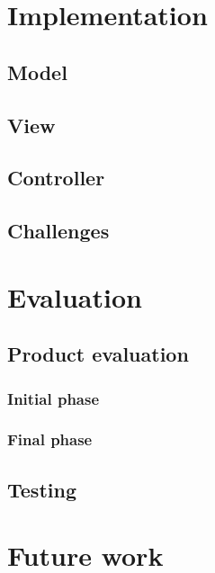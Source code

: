 \documentclass{l4proj}
\begin{document}
\chapter{Implementation}

\section{Model}

\section{View}

\section{Controller}

\section{Challenges}

\chapter{Evaluation}

\section{Product evaluation}

\subsection{Initial phase}

\subsection{Final phase}

\section{Testing}

\chapter{Future work}
\end{document}
